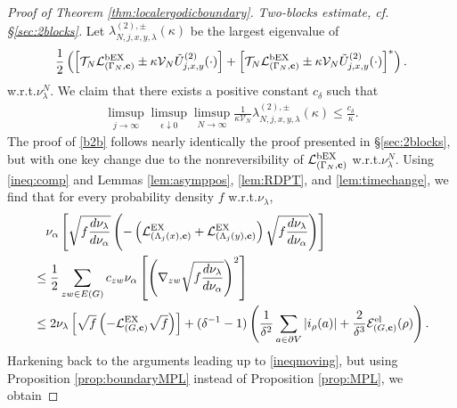 \documentclass[11pt]{amsart}
\theoremstyle{plain}
\theoremstyle{definition}
\theoremstyle{remark}
\newcommand{\Utildetwo}[3]{\tilde{U}^{(2)}_{{#1},{#2},{#3}}}
\begin{document}
\begin{proof}[Proof of Theorem \ref{thm:localergodicboundary}]
\emph{Two-blocks estimate, \emph{cf.\@} \S\ref{sec:2blocks}.} 
Let $\lambda^{(2),\pm}_{N,j,x,y,\lambda}(\kappa)$ be the largest eigenvalue of
\begin{align*}
\frac{1}{2}\left(\left[\mathcal{T}_N \mathcal{L}^{\rm bEX}_{(\Gamma_N,{\bf c})} \pm \kappa \mathcal{V}_N \Utildetwo{j}{x}{y}(\cdot)\right]+ \left[\mathcal{T}_N \mathcal{L}^{\rm bEX}_{(\Gamma_N,{\bf c})} \pm \kappa \mathcal{V}_N \Utildetwo{j}{x}{y}(\cdot)\right]^*\right).
\end{align*}
w.r.t.\@ $\nu_\lambda^N$. We claim that there exists a positive constant $c_{\delta}$ such that
\begin{align}
\label{b2b}
\limsup_{j\to\infty}\limsup_{\epsilon \downarrow 0}\limsup_{N\to\infty} \frac{1}{\kappa \mathcal{V}_N} \lambda^{(2),\pm}_{N,j,x,y,\lambda}(\kappa) \leq \frac{c_{\delta}}{\kappa}.
\end{align}
The proof of \eqref{b2b} follows nearly identically the proof presented in \S\ref{sec:2blocks}, but with one key change due to the nonreversibility of $\mathcal{L}^{\rm bEX}_{(\Gamma_N, {\bf c})}$ w.r.t.\@ $\nu_\lambda^N$. 
Using \eqref{ineq:comp} and Lemmas \ref{lem:asymppos}, \ref{lem:RDPT}, and \ref{lem:timechange}, we find that for every probability density $f$ w.r.t.\@ $\nu_\lambda$,
\begin{align*}
& \quad \nu_\alpha\left[\sqrt{f\frac{d\nu_\lambda}{d\nu_\alpha}}\left( -\left(\mathcal{L}^{\rm EX}_{(\Lambda_j(x),{\bf c})} + \mathcal{L}^{\rm EX}_{(\Lambda_j(y), {\bf c})}\right)\sqrt{f \frac{d\nu_\lambda}{d\nu_\alpha}}\right)\right]  \\
& \leq \frac{1}{2} \sum_{zw\in E(G)} c_{zw} \nu_\alpha\left[\left(\nabla_{zw}\sqrt{f\frac{d\nu_\lambda}{d\nu_\alpha}}\right)^2 \right]\\
& \leq 2\nu_\lambda\left[\sqrt{f}\left(-\mathcal{L}^{\rm EX}_{(G,{\bf c})} \sqrt{f}\right) \right] + (\delta^{-1}-1)\left(\frac{1}{\delta^2} \sum_{a\in \partial V} |i_\rho(a)| + \frac{2}{\delta^3} \mathcal{E}^{\rm el}_{(G,{\bf c})} (\rho) \right).
\end{align*}
Harkening back to the arguments leading up to \eqref{ineqmoving}, but using Proposition \ref{prop:boundaryMPL} instead of Proposition \ref{prop:MPL}, we obtain

\end{proof}
\end{document}
